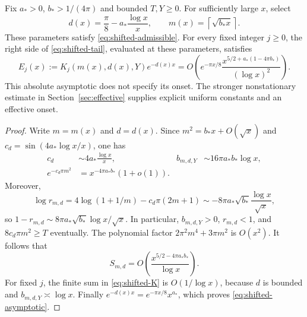 \begin{proposition}\label{prop:shifted-asymptotic}
Fix $a_*>0$, $b_*>1/(4\pi)$ and bounded $T,Y\ge0$. For sufficiently large
$x$, select
\begin{equation}\label{eq:shifted-near-boundary}
 d(x)=\frac\pi8-a_*\frac{\log x}{x},\qquad
 m(x)=\left\lceil\sqrt{b_*x}\right\rceil.
\end{equation}
These parameters satisfy \eqref{eq:shifted-admissible}. For every fixed
integer $j\ge0$, the right side of \eqref{eq:shifted-tail}, evaluated
at these parameters, satisfies
\begin{equation}\label{eq:shifted-asymptotic}
 E_j(x):=K_j(m(x),d(x),Y)e^{-d(x)x}
 =O\!\left(e^{-\pi x/8}
 \frac{x^{5/2+a_*(1-4\pi b_*)}}{(\log x)^2}\right).
\end{equation}
This absolute asymptotic does not specify its onset. The stronger
nonstationary estimate in Section~\ref{sec:effective} supplies explicit
uniform constants and an effective onset.
\end{proposition}
\begin{proof}
Write $m=m(x)$ and $d=d(x)$. Since
$m^2=b_*x+O(\sqrt x)$ and
$c_d=\sin(4a_*\log x/x)$, one has
\begin{align*}
 c_d&\sim4a_*\frac{\log x}{x},&
 b_{m,d,Y}&\sim16\pi a_*b_*\log x,\\
 e^{-c_d\pi m^2}&=x^{-4\pi a_*b_*}(1+o(1)).
\end{align*}
Moreover,
\[
 \log r_{m,d}=4\log(1+1/m)-c_d\pi(2m+1)
 \sim-8\pi a_*\sqrt{b_*}\frac{\log x}{\sqrt x},
\]
so
$1-r_{m,d}\sim8\pi a_*\sqrt{b_*}\log x/\sqrt x$.
In particular, $b_{m,d,Y}>0$, $r_{m,d}<1$, and
$8c_d\pi m^2\ge T$ eventually.
The polynomial factor $2\pi^2m^4+3\pi m^2$ is $O(x^2)$.
It follows that
\[
 S_{m,d}=O\!\left(\frac{x^{5/2-4\pi a_*b_*}}{\log x}\right).
\]
For fixed $j$, the finite sum in \eqref{eq:shifted-K} is
$O(1/\log x)$, because $d$ is bounded and $b_{m,d,Y}\asymp\log x$.
Finally $e^{-d(x)x}=e^{-\pi x/8}x^{a_*}$, which proves
\eqref{eq:shifted-asymptotic}.
\end{proof}

